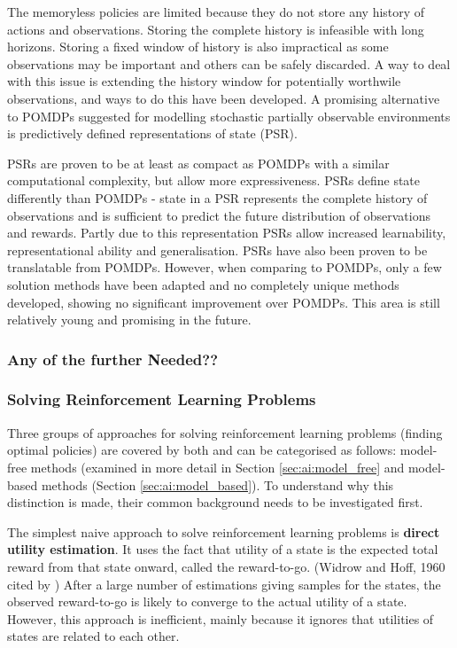 The memoryless policies are limited because they do not store any history of
actions and observations. Storing the complete history is infeasible with long
horizons. Storing a fixed window of history is also impractical as some
observations may be important and others can be safely discarded. A way to deal
with this issue is extending the history window for potentially worthwile
observations, and ways to do this have been developed. A promising alternative
to POMDPs suggested for modelling stochastic partially observable environments
is predictively defined representations of state (PSR).
\parencite{Spaan2012ai+pomdp}

PSRs are proven to be at least as compact as POMDPs with a similar
computational complexity, but allow more expressiveness. PSRs define state
differently than POMDPs - state in a PSR represents the complete history of
observations and is sufficient to predict the future distribution of
observations and rewards. Partly due to this representation PSRs allow
increased learnability, representational ability and generalisation. PSRs have
also been proven to be translatable from POMDPs. However, when comparing to
POMDPs, only a few solution methods have been adapted and no completely unique
methods developed, showing no significant improvement over POMDPs. This area is
still relatively young and promising in the future.
\parencite{Wingate2012ai+psr}







\subsubsection{Any of the further Needed??}

\subsubsection{Solving Reinforcement Learning Problems}

Three groups of approaches for solving reinforcement learning problems (finding
optimal policies) are covered by both \textcite{Russell2010ai+modern} and
\textcite{Sutton1998ai+reinforcement} can be categorised as follows: model-
free methods (examined in more detail in Section \ref{sec:ai:model_free} and
model-based methods (Section \ref{sec:ai:model_based}). To understand why this
distinction is made, their common background needs to be investigated first.

The simplest naive approach to solve reinforcement learning problems is
\textbf{direct utility estimation}. It uses the fact that utility of a state is
the expected total reward from that state onward, called the reward-to-go.
(Widrow and Hoff, 1960 cited by \textcite{Russell2010ai+modern}) After a large
number of estimations giving samples for the states, the observed reward-to-go
is likely to converge to the actual utility of a state. However, this approach
is inefficient, mainly because it ignores that utilities of states are related
to each other. \parencite{Russell2010ai+modern}

